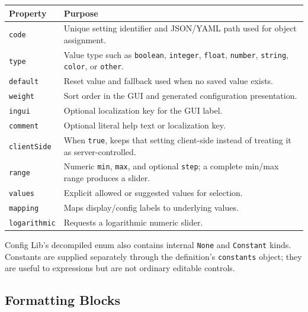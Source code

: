 \documentclass[
  11pt,
  letterpaper,
  titlepage]{article}
\newcounter{none} %
\begin{document}
{\def\LTcaptype{none} %
\begin{longtable}[]{@{}
  >{\raggedright\arraybackslash}p{}
  >{\raggedright\arraybackslash}p{}@{}}
\toprule\noalign{}
\begin{minipage}[b]{\linewidth}\raggedright
Property
\end{minipage} & \begin{minipage}[b]{\linewidth}\raggedright
Purpose
\end{minipage} \\
\midrule\noalign{}
\endhead
\bottomrule\noalign{}
\endlastfoot
\texttt{code} & Unique setting identifier and JSON/YAML path used for
object assignment. \\
\texttt{type} & Value type such as \texttt{boolean}, \texttt{integer},
\texttt{float}, \texttt{number}, \texttt{string}, \texttt{color}, or
\texttt{other}. \\
\texttt{default} & Reset value and fallback used when no saved value
exists. \\
\texttt{weight} & Sort order in the GUI and generated configuration
presentation. \\
\texttt{ingui} & Optional localization key for the GUI label. \\
\texttt{comment} & Optional literal help text or localization key. \\
\texttt{clientSide} & When \texttt{true}, keeps that setting client-side
instead of treating it as server-controlled. \\
\texttt{range} & Numeric \texttt{min}, \texttt{max}, and optional
\texttt{step}; a complete min/max range produces a slider. \\
\texttt{values} & Explicit allowed or suggested values for selection. \\
\texttt{mapping} & Maps display/config labels to underlying values. \\
\texttt{logarithmic} & Requests a logarithmic numeric slider. \\
\end{longtable}
}

Config Lib's decompiled enum also contains internal \texttt{None} and
\texttt{Constant} kinds. Constants are supplied separately through the
definition's \texttt{constants} object; they are useful to expressions
but are not ordinary editable controls.

\subsection{Formatting Blocks}\label{formatting-blocks}
\end{document}
